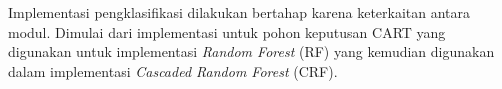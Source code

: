 Implementasi pengklasifikasi dilakukan bertahap karena keterkaitan antara
modul.
Dimulai dari implementasi untuk pohon keputusan CART yang digunakan untuk
implementasi \textit{Random Forest} (RF) yang kemudian digunakan dalam
implementasi \textit{Cascaded Random Forest} (CRF).
